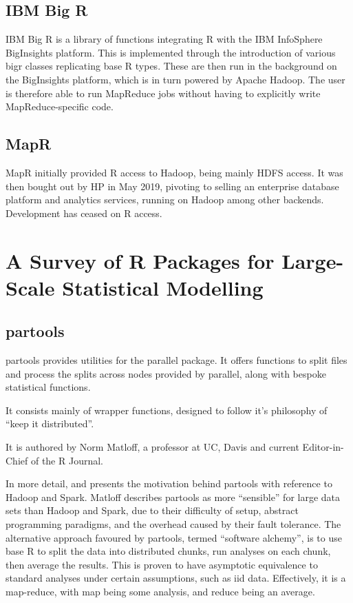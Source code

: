 \documentclass[a4paper,10pt]{article}
\begin{document}
\subsection{IBM Big R}
\label{sec:ibm-big-r}

IBM Big R is a library of functions integrating R with the IBM
InfoSphere BigInsights platform\cite{inc.14:_infos_bigin_big_r}. This
is implemented through the introduction of various bigr classes
replicating base R types. These are then run in the background on the
BigInsights platform, which is in turn powered by Apache Hadoop. The
user is therefore able to run MapReduce jobs without having to
explicitly write MapReduce-specific code.

\subsection{MapR}
\label{sec:mapr}

MapR initially provided R access to Hadoop, being mainly HDFS
access\cite{mapr19:_indus_next_gener_data_platf_ai_analy}. It was then
bought out by HP in May 2019, pivoting to selling an enterprise
database platform and analytics services, running on Hadoop among
other backends. Development has ceased on R access.

\section{A Survey of R Packages for Large-Scale Statistical Modelling}

\subsection{partools}
\label{sec:partools}

partools provides utilities for the parallel
package\cite{matloff16softw_alchemy}. It offers functions to split
files and process the splits across nodes provided by parallel, along
with bespoke statistical functions.

It consists mainly of wrapper functions, designed to follow it's
philosophy of ``keep it distributed''.

It is authored by Norm Matloff, a professor at UC, Davis and current
Editor-in-Chief of the R Journal.

In more detail, \textcite{matloff15} and \textcite{matloff17} presents
the motivation behind partools with reference to Hadoop and Spark.
Matloff describes partools as more ``sensible'' for large data sets
than Hadoop and Spark, due to their difficulty of setup, abstract
programming paradigms, and the overhead caused by their fault
tolerance. The alternative approach favoured by partools, termed
``software alchemy'', is to use base R to split the data into
distributed chunks, run analyses on each chunk, then average the
results. This is proven to have asymptotic equivalence to standard
analyses under certain assumptions, such as iid data. Effectively, it
is a map-reduce, with map being some analysis, and reduce being an
average.
\end{document}
